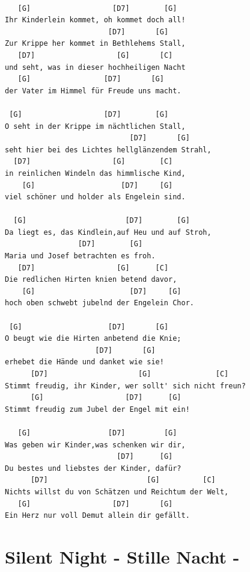\documentclass[
]{book}
\let\stdsection\section
\renewcommand\section{\clearpage\stdsection}
\begin{document}
\begin{verbatim}

   [G]                   [D7]        [G]    
Ihr Kinderlein kommet, oh kommet doch all!
                        [D7]       [G]    
Zur Krippe her kommet in Bethlehems Stall,
   [D7]                   [G]       [C] 
und seht, was in dieser hochheiligen Nacht
   [G]                 [D7]       [G]  
der Vater im Himmel für Freude uns macht.

 [G]                   [D7]        [G]  
O seht in der Krippe im nächtlichen Stall,
                             [D7]       [G]    
seht hier bei des Lichtes hellglänzendem Strahl,
  [D7]                   [G]        [C]      
in reinlichen Windeln das himmlische Kind,
    [G]                    [D7]     [G] 
viel schöner und holder als Engelein sind.

  [G]                       [D7]        [G]   
Da liegt es, das Kindlein,auf Heu und auf Stroh,
                 [D7]        [G]    
Maria und Josef betrachten es froh.
   [D7]                   [G]      [C]     
Die redlichen Hirten knien betend davor,
    [G]                      [D7]     [G]    
hoch oben schwebt jubelnd der Engelein Chor.

 [G]                    [D7]       [G]   
O beugt wie die Hirten anbetend die Knie;
                     [D7]       [G]    
erhebet die Hände und danket wie sie!
      [D7]                     [G]               [C]     
Stimmt freudig, ihr Kinder, wer sollt' sich nicht freun?
      [G]                   [D7]      [G]        
Stimmt freudig zum Jubel der Engel mit ein!

   [G]                  [D7]         [G]   
Was geben wir Kinder,was schenken wir dir,
                          [D7]      [G]    
Du bestes und liebstes der Kinder, dafür?
      [D7]                       [G]          [C]        
Nichts willst du von Schätzen und Reichtum der Welt,
   [G]                   [D7]       [G]        
Ein Herz nur voll Demut allein dir gefällt.
\end{verbatim}

\hypertarget{silent-night---stille-nacht--}{%
\section{Silent Night - Stille Nacht -}\label{silent-night---stille-nacht--}}
\end{document}
